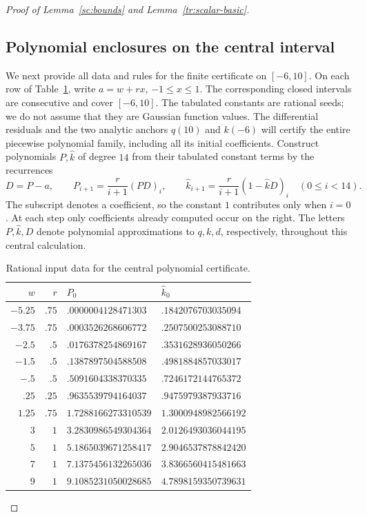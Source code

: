 \begin{proof}[Proof of Lemma~\ref{sc:bounds} and Lemma~\ref{tr:scalar-basic}]
\subsection*{Polynomial enclosures on the central interval}
We next provide all data and rules for the finite certificate on $[-6,10]$.
On each row of Table~\ref{cert:centers}, write $a=w+rx$, $-1\le x\le1$.
The corresponding closed intervals are consecutive and cover $[-6,10]$.
The tabulated constants are rational seeds; we do not assume that they are
Gaussian function values. The differential residuals and the two analytic
anchors $q(10)$ and $k(-6)$ will certify the entire piecewise polynomial
family, including all its initial coefficients.
Construct polynomials $P,\widehat k$ of degree $14$ from their tabulated constant
terms by the recurrences
\begin{equation}\label{cert:recurrence}
 D=P-a,\qquad
 P_{i+1}=\frac r{i+1}(PD)_i,\qquad
 \widehat k_{i+1}=\frac r{i+1}(1-\widehat k D)_i\quad(0\le i<14).
\end{equation}
The subscript denotes a coefficient, so the constant $1$ contributes only
when $i=0$. At each step only coefficients already computed occur on the
right. The letters $P,\widehat k,D$ denote polynomial approximations to $q,k,d$,
respectively, throughout this central calculation.

\begin{table}[htbp]
\centering
\caption{Rational input data for the central polynomial certificate.}
\label{cert:centers}
\begin{tabular}{r r l l}
\hline
$w$&$r$&$P_0$&$\widehat k_0$\\\hline
$-5.25$&$.75$&$.0000004128471303$&$.1842076703035094$\\
$-3.75$&$.75$&$.0003526268606772$&$.2507500253088710$\\
$-2.5$&$.5$&$.0176378254869167$&$.3531628936050266$\\
$-1.5$&$.5$&$.1387897504588508$&$.4981884857033017$\\
$-.5$&$.5$&$.5091604338370335$&$.7246172144765372$\\
$.25$&$.25$&$.9635539794164037$&$.9475979387933716$\\
$1.25$&$.75$&$1.7288166273310539$&$1.3000948982566192$\\
$3$&$1$&$3.2830986549304364$&$2.0126493036044195$\\
$5$&$1$&$5.1865039671258417$&$2.9046537878842420$\\
$7$&$1$&$7.1375456132265036$&$3.8366560415481663$\\
$9$&$1$&$9.1085231050028685$&$4.7898159350739631$\\\hline
\end{tabular}
\end{table}


\end{proof}

